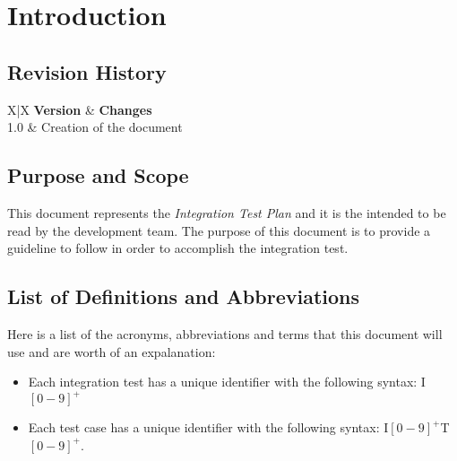 \section{Introduction} %
\label{sec:introduction}

\subsection{Revision History} %
\label{sub:revision_history}
\begin{tabularx}{\textwidth}{ X|X }
	\textbf{Version} & \textbf{Changes} \\ \hline
	 {1.0} & Creation of the document \\
\end{tabularx}

\subsection{Purpose and Scope} %
\label{sub:purpose_and_scope}

This document represents the \emph{Integration Test Plan} and it is the intended to be read by the development team.
The purpose of this document is to provide a guideline to follow in order to accomplish the integration test.


\subsection{List of Definitions and Abbreviations} %
\label{sub:definitions_and_abbreviations}
Here is a list of the acronyms, abbreviations and terms that this document will use and are worth of an expalanation:

\begin{itemize}
	\item Each integration test has a unique identifier with the following syntax: \newline I$[0-9]^+$
	\item Each test case has a unique identifier with the following syntax: \newline I$[0-9]^+$T$[0-9]^+$.
\end{itemize}


